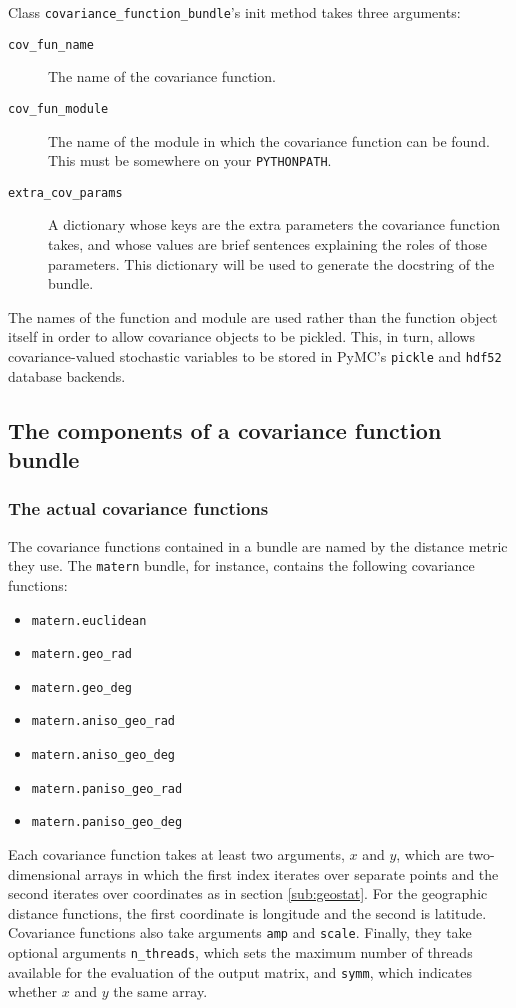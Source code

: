 \documentclass[]{manual}
\begin{document}
Class \texttt{covariance_function_bundle}'s init method takes three arguments: 
\begin{description}
	\item[\texttt{cov_fun_name}] The name of the covariance function.
	\item[\texttt{cov_fun_module}] The name of the module in which the covariance function can be found. This must be somewhere on your \texttt{PYTHONPATH}.
	\item[\texttt{extra_cov_params}] A dictionary whose keys are the extra parameters the covariance function takes, and whose values are brief sentences explaining the roles of those parameters. This dictionary will be used to generate the docstring of the bundle.
\end{description}
The names of the function and module are used rather than the function object itself in order to allow covariance objects to be pickled. This, in turn, allows covariance-valued stochastic variables to be stored in PyMC's \texttt{pickle} and \texttt{hdf52} database backends.


\subsection{The components of a covariance function bundle}

\subsubsection{The actual covariance functions}\label{sub:distances}
The covariance functions contained in a bundle are named by the distance metric they use. The \texttt{matern} bundle, for instance, contains the following covariance functions:
\begin{itemize}
	\item \texttt{matern.euclidean}
	\item \texttt{matern.geo_rad}
	\item \texttt{matern.geo_deg}
	\item \texttt{matern.aniso_geo_rad}
	\item \texttt{matern.aniso_geo_deg}
	\item \texttt{matern.paniso_geo_rad}	
	\item \texttt{matern.paniso_geo_deg}
\end{itemize}

Each covariance function takes at least two arguments, $x$ and $y$, which are two-dimensional arrays in which the first index iterates over separate points and the second iterates over coordinates as in section \ref{sub:geostat}. For the geographic distance functions, the first coordinate is longitude and the second is latitude. Covariance functions also take arguments \texttt{amp} and \texttt{scale}. Finally, they take optional arguments \texttt{n_threads}, which sets the maximum number of threads available for the evaluation of the output matrix, and \texttt{symm}, which indicates whether $x$ and $y$ the same array. 
\end{document}
